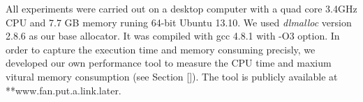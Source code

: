 All experiments were carried out on a desktop computer with a quad core 3.4GHz CPU and 7.7 GB memory runing 64-bit Ubuntu 13.10. We used \emph{dlmalloc} version 2.8.6 as our base allocator. It was compiled with gcc 4.8.1 with -O3 option. In order to capture the execution time and memory consuming precisly, we developed our own performance tool to measure the CPU time and maxium vitural memory consumption (see Section \ref{}). The tool is publicly available at **www.fan.put.a.link.later.

